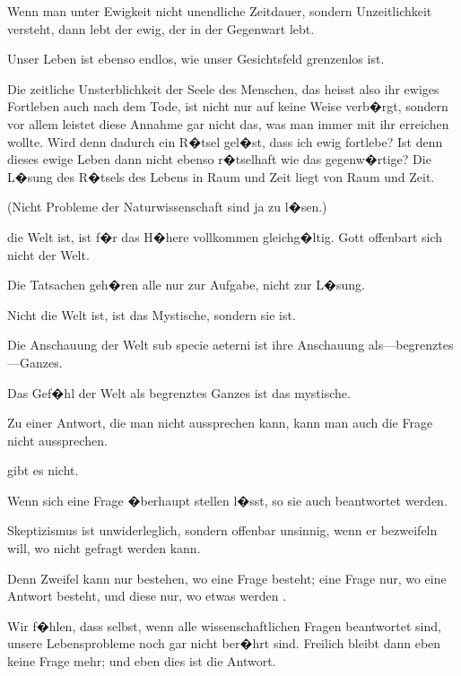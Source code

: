 \begin{propositions}
{Wenn man unter Ewigkeit nicht unendliche
Zeitdauer, sondern Unzeitlichkeit versteht, dann
lebt der ewig, der in der Gegenwart lebt.

Unser Leben ist ebenso endlos, wie unser
Gesichtsfeld grenzenlos ist.}


{Die zeitliche Unsterblichkeit der Seele des
Menschen, das heisst also ihr ewiges Fortleben
auch nach dem Tode, ist nicht nur auf keine Weise
verb�rgt, sondern vor allem leistet diese Annahme
gar nicht das, was man immer mit ihr erreichen
wollte. Wird denn dadurch ein R�tsel gel�st, dass
ich ewig fortlebe? Ist denn dieses ewige Leben
dann nicht ebenso r�tselhaft wie das gegenw�rtige?
Die L�sung des R�tsels des Lebens in Raum und
Zeit liegt  von Raum und Zeit.

(Nicht Probleme der Naturwissenschaft sind ja
zu l�sen.)}


{ die Welt ist, ist f�r das H�here vollkommen
\enlargethispage{1pt} %
gleichg�ltig. Gott offenbart sich nicht 
der Welt.}


{Die Tatsachen geh�ren alle nur zur Aufgabe,
nicht zur L�sung.}


{Nicht  die Welt ist, ist das Mystische,
sondern  sie ist.}


{Die Anschauung der Welt sub specie aeterni
ist ihre Anschauung als---be\-grenz\-tes---Gan\-zes.

Das Gef�hl der Welt als begrenztes Ganzes ist
das mystische.}


{Zu einer Antwort, die man nicht aussprechen
kann, kann man auch die Frage nicht aussprechen.

 gibt es nicht.

Wenn sich eine Frage �berhaupt stellen l�sst,
so  sie auch beantwortet werden.}


{Skeptizismus ist  unwiderleglich, sondern
offenbar unsinnig, wenn er bezweifeln will, wo
nicht gefragt werden kann.

Denn Zweifel kann nur bestehen, wo eine Frage
besteht; eine Frage nur, wo eine Antwort besteht,
und diese nur, wo etwas  werden .}


{Wir f�hlen, dass selbst, wenn alle 
wissenschaftlichen Fragen beantwortet sind, unsere
Lebensprobleme noch gar nicht ber�hrt sind.
Freilich bleibt dann eben keine Frage mehr; und
eben dies ist die Antwort.}



\end{propositions}
